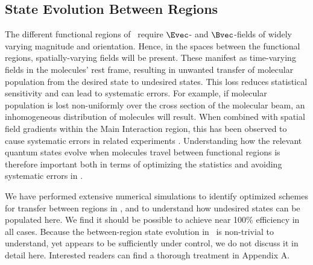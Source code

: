 \subsection{State Evolution Between Regions}

The different functional regions of \CENTREX\ require $\Evec$- and $\Bvec$-fields of widely varying magnitude and orientation. Hence, in the spaces between the functional regions, spatially-varying fields will be present. These manifest as time-varying fields in the molecules' rest frame, resulting in unwanted transfer of molecular population from the desired state to undesired states. This loss reduces statistical sensitivity and can lead to systematic errors. For example, if molecular population is lost non-uniformly over the cross section of the molecular beam, an inhomogeneous distribution of molecules will result. When combined with spatial field gradients within the Main Interaction region, this has been observed to cause systematic errors in related experiments \cite{andreev_improved_2018}. Understanding how the relevant quantum states evolve when molecules travel between functional regions is therefore important both in terms of optimizing the statistics and avoiding systematic errors in \CENTREX.

We have performed extensive numerical simulations to identify optimized schemes for transfer between regions in \CENTREX, and to understand how undesired states can be populated here.  We find it should be possible to achieve near 100\% efficiency in all cases.  Because the between-region state evolution in \CENTREX\ is non-trivial to understand, yet appears to be sufficiently under control, we do not discuss it in detail here.  Interested readers can find a thorough treatment in Appendix A.